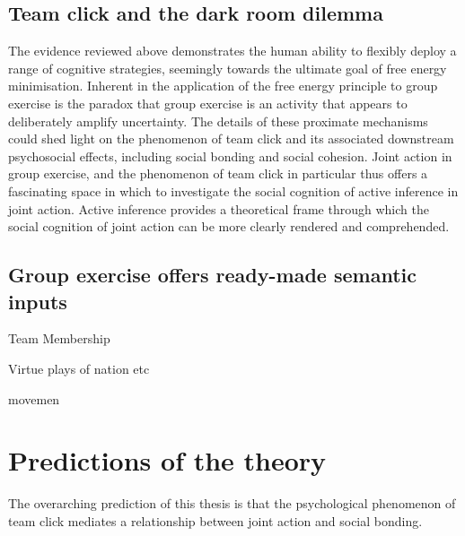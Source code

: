 \begin{CJK}{UTF8}{gbsn}
    \subsection{Team click and the dark room dilemma}
    The evidence reviewed above demonstrates the human ability to flexibly deploy a range of cognitive strategies, seemingly towards the ultimate goal of free energy minimisation.  Inherent in the application of the free energy principle to group exercise is the paradox that group exercise is an activity that appears to deliberately amplify uncertainty.
    The details of these proximate mechanisms could shed light on the phenomenon of team click and its associated downstream psychosocial effects, including social bonding and social cohesion.  Joint action in group exercise, and the phenomenon of team click in particular thus offers a fascinating space in which to investigate the social cognition of active inference in joint action.  Active inference provides a theoretical frame through which the social cognition of joint action can be more clearly rendered and comprehended.




    \subsection{Group exercise offers ready-made semantic inputs}



    Team Membership

    Virtue plays of nation etc

    movemen




    \section{Predictions of the theory}


        The overarching prediction of this thesis is that the psychological phenomenon of team click mediates a relationship between joint action and social bonding.


\end{CJK}
